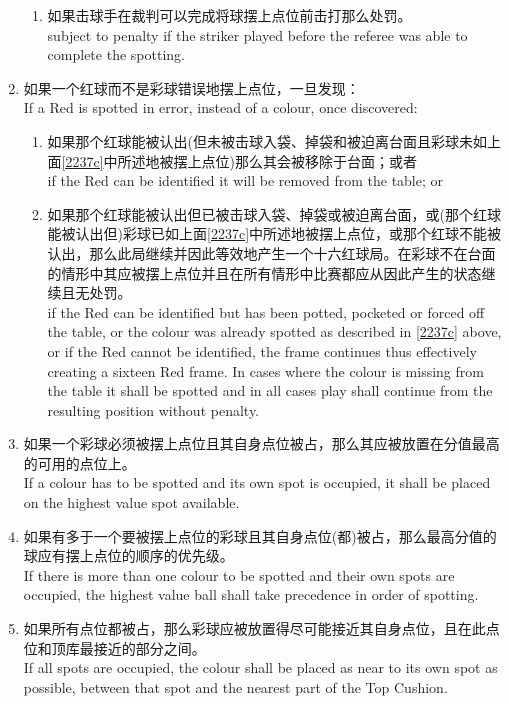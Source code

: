 \begin{enumerate}[label=(\alph*)]
\begin{enumerate}[label=(\roman*)]
        \item 如果击球手在裁判可以完成将球摆上点位前击打那么处罚。\\
        subject to penalty if the striker played before the referee was able to complete the spotting.
    \end{enumerate}
    \item 如果一个红球而不是彩球错误地摆上点位，一旦发现：\\
    If a Red is spotted in error, instead of a colour, once discovered:
    \begin{enumerate}[label=(\roman*)]
        \item 如果那个红球能被认出(但未被击球入袋、掉袋和被迫离台面且彩球未如上面\ref{2237c}中所述地被摆上点位)那么其会被移除于台面；或者\\
        if the Red can be identified it will be removed from the table; or
        \item 如果那个红球能被认出但已被击球入袋、掉袋或被迫离台面，或(那个红球能被认出但)彩球已如上面\ref{2237c}中所述地被摆上点位，或那个红球不能被认出，那么此局继续并因此等效地产生一个十六红球局。在彩球不在台面的情形中其应被摆上点位并且在所有情形中比赛都应从因此产生的状态继续且无处罚。\\
        if the Red can be identified but has been potted, pocketed or forced off the table, or the colour was already spotted as described in \ref{2237c} above, or if the Red cannot be identified, the frame continues thus effectively creating a sixteen Red frame. In cases where the colour is missing from the table it shall be spotted and in all cases play shall continue from the resulting position without penalty. 
    \end{enumerate}
    \item 如果一个彩球必须被摆上点位且其自身点位被占，那么其应被放置在分值最高的可用的点位上。\\
    If a colour has to be spotted and its own spot is occupied, it shall be placed on the highest value spot available.
    \item 如果有多于一个要被摆上点位的彩球且其自身点位(都)被占，那么最高分值的球应有摆上点位的顺序的优先级。\\
    If there is more than one colour to be spotted and their own spots are occupied, the highest value ball shall take precedence in order of spotting.
    \item 如果所有点位都被占，那么彩球应被放置得尽可能接近其自身点位，且在此点位和顶库最接近的部分之间。\\
    If all spots are occupied, the colour shall be placed as near to its own spot as possible, between that spot and the nearest part of the Top Cushion.

\end{enumerate}
